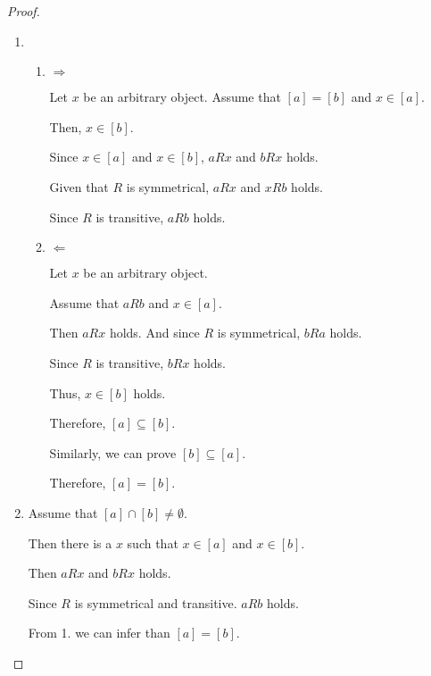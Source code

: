 \documentclass[12pt,a4paper,utf8]{article}
\theoremstyle{plain}
\begin{document}
\begin{proof}\
    \begin{enumerate}
        \item 
        \begin{enumerate}
            \item
            
            $\Rightarrow$
            
            Let $x$ be an arbitrary object. Assume that $[a]=[b]$ and $x \in [a]$.
            
            Then, $x \in [b]$.
            
            Since $x \in [a]$ and $x \in [b]$, $aRx$ and $bRx$ holds.
            
            Given that $R$ is symmetrical, $aRx$ and $xRb$ holds.
            
            Since $R$ is transitive, $aRb$ holds. 
            
            \item 
            
            $\Leftarrow$
            
            Let $x$ be an arbitrary object.
            
            Assume that $aRb$ and $x \in [a]$.
            
            Then $aRx$ holds. And since $R$ is symmetrical, $bRa$ holds.
            
            Since $R$ is transitive, $bRx$ holds.
            
            Thus, $x \in [b]$ holds. 
            
            Therefore, $[a] \subseteq [b]$.
            
            Similarly, we can prove $[b] \subseteq [a]$.
            
            Therefore, $[a]=[b]$.
        \end{enumerate}
        
        \item
        Assume that $[a] \cap [b] \neq \emptyset$.
        
        Then there is a $x$ such that $x \in [a]$ and $x \in [b]$.
        
        Then $aRx$ and $bRx$ holds.
        
        Since $R$ is symmetrical and transitive. $aRb$ holds.
        
        From 1. we can infer than $[a]=[b]$.
        

\end{enumerate}
\end{proof}
\end{document}
